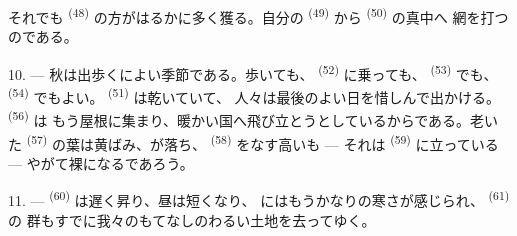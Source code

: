 それでも \textsuperscript{(48)} の方がはるかに多く獲る。自分の
 \textsuperscript{(49)} から \textsuperscript{(50)} の真中へ
網を打つのである。

10. --- 秋は出歩くによい季節である。歩いても、 \textsuperscript{(52)}
に乗っても、 \textsuperscript{(53)} でも、
\textsuperscript{(54)} でもよい。 \textsuperscript{(51)} は乾いていて、
人々は最後のよい日を惜しんで出かける。 \textsuperscript{(56)} は
もう屋根に集まり、暖かい国へ飛び立とうとしているからである。老いた
 \textsuperscript{(57)} の葉は黄ばみ、が落ち、
 \textsuperscript{(58)} をなす高いも --- それは
 \textsuperscript{(59)} に立っている --- やがて裸になるであろう。

11. ---  \textsuperscript{(60)} は遅く昇り、昼は短くなり、
にはもうかなりの寒さが感じられ、 \textsuperscript{(61)} の
群もすでに我々のもてなしのわるい土地を去ってゆく。
\VUsaut{6.0mm}
\VUfilet{22mm}
